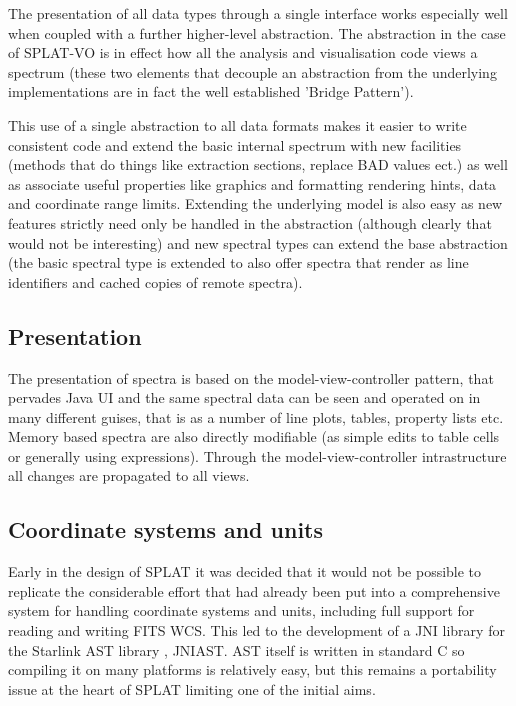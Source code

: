 \documentclass[final,authoryear,5p,times,twocolumn]{elsarticle}
\begin{document}
The presentation of all data types through a single interface works especially
well when coupled with a further higher-level abstraction. The abstraction in
the case of SPLAT-VO is in effect how all the analysis and visualisation code
views a spectrum (these two elements that decouple an abstraction from the
underlying implementations are in fact the well established 'Bridge Pattern').

This use of a single abstraction to all data formats makes it easier to write
consistent code and extend the basic internal spectrum with new facilities
(methods that do things like extraction sections, replace BAD values ect.) as
well as associate useful properties like graphics and formatting rendering
hints, data and coordinate range limits. Extending the underlying model is
also easy as new features strictly need only be handled in the abstraction
(although clearly that would not be interesting) and new spectral types can
extend the base abstraction (the basic spectral type is extended to also offer
spectra that render as line identifiers and cached copies of remote spectra).


\subsection{Presentation}

The presentation of spectra is based on the model-view-controller pattern,
that pervades Java UI and the same spectral data can be seen and operated on
in many different guises, that is as a number of line plots, tables, property
lists etc. Memory based spectra are also directly modifiable (as simple edits
to table cells or generally using expressions). Through the
model-view-controller intrastructure all changes are propagated to all views.


\subsection{Coordinate systems and units}

Early in the design of SPLAT it was decided that it would not be possible to
replicate the considerable effort that had already been put into a
comprehensive system for handling coordinate systems and units, including full
support for reading and writing FITS WCS. This led to the development of a JNI
library for the Starlink AST library \citep{1998ASPC..145...41W}, JNIAST. AST itself is written
in standard C so compiling it on many platforms is relatively easy, but this
remains a portability issue at the heart of SPLAT limiting one of the initial
aims.
\end{document}
